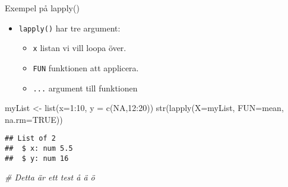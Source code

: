 \documentclass[
  11pt,
  ignorenonframetext,
]{beamer}
\newenvironment{Shaded}{\begin{snugshade}}{\end{snugshade}}
\newcommand{\AttributeTok}[1]{\textcolor[rgb]{0.77,0.63,0.00}{#1}}
\newcommand{\CommentTok}[1]{\textcolor[rgb]{0.56,0.35,0.01}{\textit{#1}}}
\newcommand{\ConstantTok}[1]{\textcolor[rgb]{0.00,0.00,0.00}{#1}}
\newcommand{\DecValTok}[1]{\textcolor[rgb]{0.00,0.00,0.81}{#1}}
\newcommand{\FunctionTok}[1]{\textcolor[rgb]{0.00,0.00,0.00}{#1}}
\newcommand{\NormalTok}[1]{#1}
\newcommand{\OtherTok}[1]{\textcolor[rgb]{0.56,0.35,0.01}{#1}}
\newcommand{\SpecialCharTok}[1]{\textcolor[rgb]{0.00,0.00,0.00}{#1}}
\providecommand{\tightlist}{%
  \setlength{\itemsep}{0pt}\setlength{\parskip}{0pt}}
\begin{document}
\begin{frame}[fragile]{Exempel på lapply()}
\protect\hypertarget{exempel-puxe5-lapply}{}
\begin{itemize}
\tightlist
\item
  \texttt{lapply()} har tre argument:

  \begin{itemize}
  \tightlist
  \item
    \texttt{x} listan vi vill loopa över.
  \item
    \texttt{FUN} funktionen att applicera.
  \item
    \texttt{...} argument till funktionen
  \end{itemize}
\end{itemize}

\begin{Shaded}
\begin{Highlighting}[]
\NormalTok{myList }\OtherTok{\textless{}{-}} \FunctionTok{list}\NormalTok{(}\AttributeTok{x=}\DecValTok{1}\SpecialCharTok{:}\DecValTok{10}\NormalTok{, }\AttributeTok{y =} \FunctionTok{c}\NormalTok{(}\ConstantTok{NA}\NormalTok{,}\DecValTok{12}\SpecialCharTok{:}\DecValTok{20}\NormalTok{))}
\FunctionTok{str}\NormalTok{(}\FunctionTok{lapply}\NormalTok{(}\AttributeTok{X=}\NormalTok{myList, }\AttributeTok{FUN=}\NormalTok{mean, }\AttributeTok{na.rm=}\ConstantTok{TRUE}\NormalTok{))}
\end{Highlighting}
\end{Shaded}

\begin{verbatim}
## List of 2
##  $ x: num 5.5
##  $ y: num 16
\end{verbatim}

\begin{Shaded}
\begin{Highlighting}[]
\CommentTok{\# Detta är ett test å ä ö}
\end{Highlighting}
\end{Shaded}
\end{frame}
\end{document}
